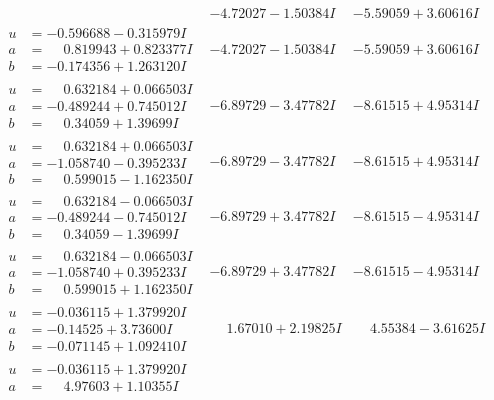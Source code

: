 \documentclass[1p]{elsarticle_modified}
\theoremstyle{definition}
\begin{document}
$$\begin{array}{c|c|c}
 & -4.72027 - 1.50384 I & -5.59059 + 3.60616 I \\ \hline\begin{aligned}
u &= -0.596688 - 0.315979 I \\
a &= \phantom{-}0.819943 + 0.823377 I \\
b &= -0.174356 + 1.263120 I\end{aligned}
 & -4.72027 - 1.50384 I & -5.59059 + 3.60616 I \\ \hline\begin{aligned}
u &= \phantom{-}0.632184 + 0.066503 I \\
a &= -0.489244 + 0.745012 I \\
b &= \phantom{-}0.34059 + 1.39699 I\end{aligned}
 & -6.89729 - 3.47782 I & -8.61515 + 4.95314 I \\ \hline\begin{aligned}
u &= \phantom{-}0.632184 + 0.066503 I \\
a &= -1.058740 - 0.395233 I \\
b &= \phantom{-}0.599015 - 1.162350 I\end{aligned}
 & -6.89729 - 3.47782 I & -8.61515 + 4.95314 I \\ \hline\begin{aligned}
u &= \phantom{-}0.632184 - 0.066503 I \\
a &= -0.489244 - 0.745012 I \\
b &= \phantom{-}0.34059 - 1.39699 I\end{aligned}
 & -6.89729 + 3.47782 I & -8.61515 - 4.95314 I \\ \hline\begin{aligned}
u &= \phantom{-}0.632184 - 0.066503 I \\
a &= -1.058740 + 0.395233 I \\
b &= \phantom{-}0.599015 + 1.162350 I\end{aligned}
 & -6.89729 + 3.47782 I & -8.61515 - 4.95314 I \\ \hline\begin{aligned}
u &= -0.036115 + 1.379920 I \\
a &= -0.14525 + 3.73600 I \\
b &= -0.071145 + 1.092410 I\end{aligned}
 & \phantom{-}1.67010 + 2.19825 I & \phantom{-}4.55384 - 3.61625 I \\ \hline\begin{aligned}
u &= -0.036115 + 1.379920 I \\
a &= \phantom{-}4.97603 + 1.10355 I \\

\end{aligned}
\end{array}$$
\end{document}
